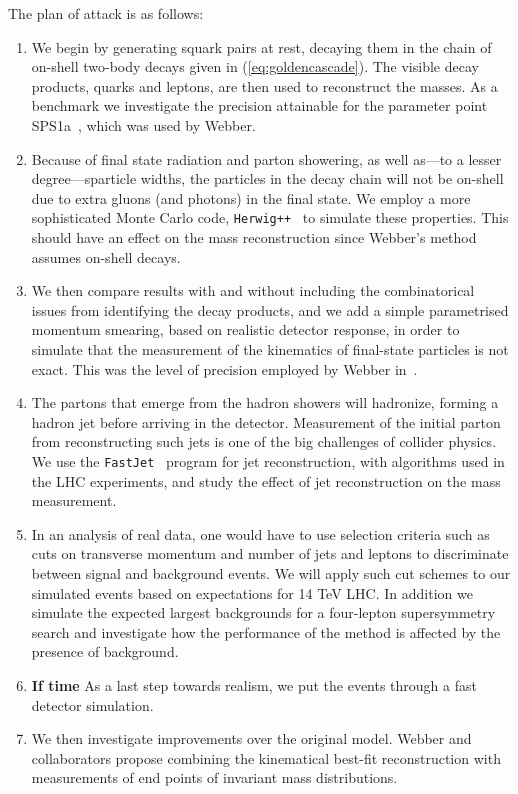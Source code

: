 \documentclass[twoside,english]{uiofysmaster}
\begin{document}
The plan of attack is as follows:
\begin{enumerate}
	\item We begin by generating squark pairs at rest, decaying them in the chain of on-shell two-body decays given in (\ref{eq:goldencascade}). The visible decay products, quarks and leptons, are then used to reconstruct the masses. As a benchmark we investigate the precision attainable for the parameter point SPS1a~\cite{Allanach:2002nj}, which was used by Webber. 
	\item Because of final state radiation and parton showering, as well as---to a lesser degree---sparticle widths, the particles in the decay chain will not be on-shell due to extra gluons (and photons) in the final state. We employ a more sophisticated Monte Carlo code, {\tt Herwig++}~\cite{Bahr:2008pv}  to simulate these properties. This should have an effect on the mass reconstruction since Webber's method assumes on-shell decays.
	\item	We then compare results with and without including the combinatorical issues from identifying the decay products, and we add a simple parametrised momentum smearing, based on realistic detector response, in order to simulate that the measurement of the kinematics of final-state particles is not exact. This was the level of precision employed by Webber in~\cite{Webber:2009vm}.
	\item The partons that emerge from the hadron showers will hadronize, forming a hadron jet before arriving in the detector. Measurement of the initial parton from reconstructing such jets is one of the big challenges of collider physics. We use the {\tt FastJet}~\cite{Cacciari:2011ma} program for jet reconstruction, with algorithms used in the LHC experiments, and study the effect of jet reconstruction on the mass measurement.
	\item In an analysis of real data, one would have to use selection criteria such as cuts on transverse momentum and number of jets and leptons to discriminate between signal and background events. We will apply such cut schemes to our simulated events based on expectations for 14 TeV LHC. In addition we simulate the expected largest backgrounds for a four-lepton supersymmetry search and investigate how the performance of the method is affected by the presence of background.
	\item {\bf If time} As a last step towards realism, we put the events through a fast detector simulation. 
	\item We then investigate improvements over the original model. Webber and collaborators \cite{Nojiri:2010dk} propose combining the kinematical best-fit reconstruction with measurements of end points of invariant mass distributions.

\end{enumerate}
\end{document}
